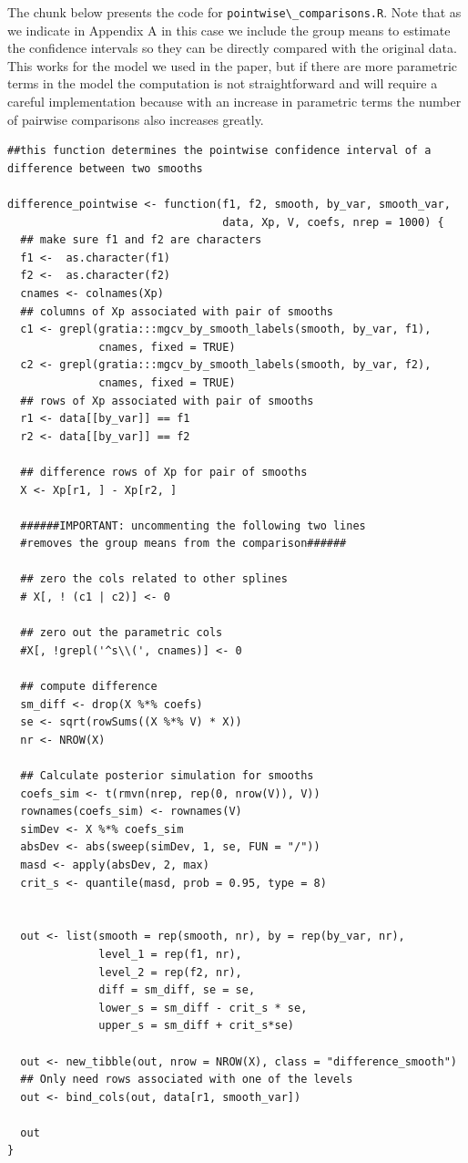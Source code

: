 \documentclass[
]{article}
\newcommand{\passthrough}[1]{#1}
\begin{document}
The chunk below presents the code for \passthrough{\lstinline!pointwise\_comparisons.R!}. Note that as we indicate in Appendix A in this case we include the group means to estimate the confidence intervals so they can be directly compared with the original data. This works for the model we used in the paper, but if there are more parametric terms in the model the computation is not straightforward and will require a careful implementation because with an increase in parametric terms the number of pairwise comparisons also increases greatly.

\begin{lstlisting}
##this function determines the pointwise confidence interval of a difference between two smooths

difference_pointwise <- function(f1, f2, smooth, by_var, smooth_var, 
                                 data, Xp, V, coefs, nrep = 1000) {
  ## make sure f1 and f2 are characters
  f1 <-  as.character(f1)
  f2 <-  as.character(f2)
  cnames <- colnames(Xp)
  ## columns of Xp associated with pair of smooths
  c1 <- grepl(gratia:::mgcv_by_smooth_labels(smooth, by_var, f1),
              cnames, fixed = TRUE)
  c2 <- grepl(gratia:::mgcv_by_smooth_labels(smooth, by_var, f2), 
              cnames, fixed = TRUE)
  ## rows of Xp associated with pair of smooths
  r1 <- data[[by_var]] == f1
  r2 <- data[[by_var]] == f2
  
  ## difference rows of Xp for pair of smooths
  X <- Xp[r1, ] - Xp[r2, ]
  
  ######IMPORTANT: uncommenting the following two lines
  #removes the group means from the comparison######
  
  ## zero the cols related to other splines
  # X[, ! (c1 | c2)] <- 0
  
  ## zero out the parametric cols
  #X[, !grepl('^s\\(', cnames)] <- 0
  
  ## compute difference
  sm_diff <- drop(X %*% coefs)
  se <- sqrt(rowSums((X %*% V) * X))
  nr <- NROW(X)
  
  ## Calculate posterior simulation for smooths
  coefs_sim <- t(rmvn(nrep, rep(0, nrow(V)), V))
  rownames(coefs_sim) <- rownames(V)
  simDev <- X %*% coefs_sim
  absDev <- abs(sweep(simDev, 1, se, FUN = "/"))
  masd <- apply(absDev, 2, max)
  crit_s <- quantile(masd, prob = 0.95, type = 8)
  
  
  out <- list(smooth = rep(smooth, nr), by = rep(by_var, nr),
              level_1 = rep(f1, nr),
              level_2 = rep(f2, nr),
              diff = sm_diff, se = se,
              lower_s = sm_diff - crit_s * se,
              upper_s = sm_diff + crit_s*se)
  
  out <- new_tibble(out, nrow = NROW(X), class = "difference_smooth")
  ## Only need rows associated with one of the levels
  out <- bind_cols(out, data[r1, smooth_var])
  
  out
}
\end{lstlisting}
\end{document}
